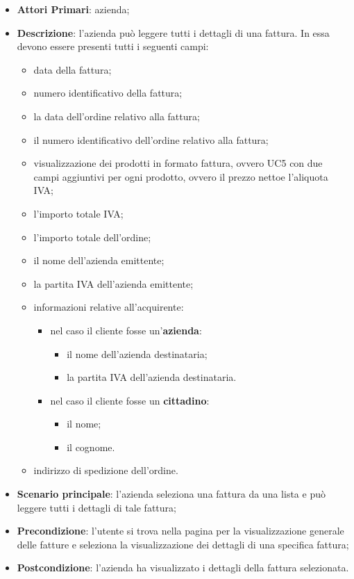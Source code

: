 \begin{itemize}
	\item \textbf{Attori Primari}: azienda;
	\item \textbf{Descrizione}: l'azienda può leggere tutti i dettagli di una fattura. In essa devono essere presenti tutti i seguenti campi:
	\begin{itemize}
		\item data della fattura;
		\item numero identificativo della fattura;
		\item la data dell'ordine relativo alla fattura;
		\item il numero identificativo dell'ordine relativo alla fattura;
		\item visualizzazione dei prodotti in formato fattura, ovvero UC5 con due campi aggiuntivi per ogni prodotto, ovvero il prezzo netto\glosp e l'aliquota IVA;
		\item l'importo totale IVA;
		\item l'importo totale dell'ordine;
		\item il nome dell'azienda emittente;
		\item la partita IVA dell'azienda emittente;
		\item informazioni relative all'acquirente:
		\begin{itemize}
			\item nel caso il cliente fosse un'\textbf{azienda}:
			\begin{itemize}
				\item il nome dell'azienda destinataria;
				\item la partita IVA dell'azienda destinataria.
			\end{itemize}
			\item nel caso il cliente fosse un \textbf{cittadino}:
			\begin{itemize}
				\item il nome;
				\item il cognome.
			\end{itemize}
		\end{itemize}
		
		\item indirizzo di spedizione dell'ordine.
	\end{itemize}
	\item \textbf{Scenario principale}: l'azienda seleziona una fattura da una lista e può leggere tutti i dettagli di tale fattura;
	\item \textbf{Precondizione}: l'utente si trova nella pagina per la visualizzazione generale delle fatture e seleziona la visualizzazione dei dettagli di una specifica fattura;
	\item \textbf{Postcondizione}: l'azienda ha visualizzato i dettagli della fattura selezionata.
\end{itemize} 


